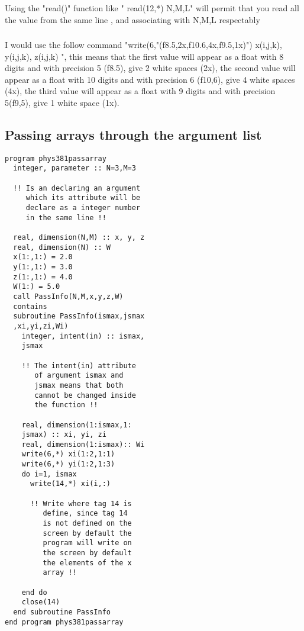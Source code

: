 \documentclass[twocolumn]{article}
\begin{document}
\subsubsection{}
\paragraph*{}
 Using the "read()" function like " read(12,*) N,M,L" will permit that you read all the value from the same line , and associating with N,M,L respectably

\subsubsection{}
\paragraph*{}
I would use the follow command "write(6,"(f8.5,2x,f10.6,4x,f9.5,1x)") x(i,j,k), y(i,j,k), z(i,j,k) ", this means that the first value will appear as a float with 8 digits and with precision 5 (f8.5), give 2 white spaces (2x), the second value will appear as a float with 10 digits and with precision 6 (f10,6), give 4 white spaces (4x), the third value will appear as a float with 9 digits and with precision 5(f9,5), give 1 white space (1x).

\subsection{Passing arrays through the argument list}
\begin{verbatim}
program phys381passarray
  integer, parameter :: N=3,M=3 
  
  !! Is an declaring an argument
     which its attribute will be
     declare as a integer number
     in the same line !!
     
  real, dimension(N,M) :: x, y, z
  real, dimension(N) :: W
  x(1:,1:) = 2.0 
  y(1:,1:) = 3.0
  z(1:,1:) = 4.0
  W(1:) = 5.0 
  call PassInfo(N,M,x,y,z,W)
  contains
  subroutine PassInfo(ismax,jsmax
  ,xi,yi,zi,Wi)
    integer, intent(in) :: ismax,
    jsmax 
    
    !! The intent(in) attribute 
       of argument ismax and 
       jsmax means that both
       cannot be changed inside
       the function !!
       
    real, dimension(1:ismax,1:
    jsmax) :: xi, yi, zi
    real, dimension(1:ismax):: Wi
    write(6,*) xi(1:2,1:1)
    write(6,*) yi(1:2,1:3)
    do i=1, ismax
      write(14,*) xi(i,:) 
      
      !! Write where tag 14 is 
         define, since tag 14
         is not defined on the
         screen by default the
         program will write on
         the screen by default
         the elements of the x
         array !!
         
    end do
    close(14)
  end subroutine PassInfo
end program phys381passarray
\end{verbatim}
\end{document}
